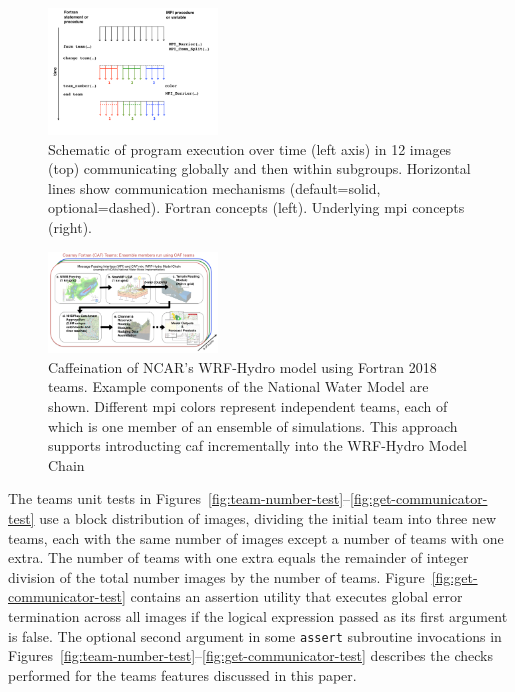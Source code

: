 \begin{figure}
\includegraphics[width=0.4\textwidth]{figures/teams}
\vspace{-24pt}
\caption{Schematic of program execution over time
  (left axis) in 12 images (top) communicating globally and then within subgroups.  Horizontal lines show communication mechanisms (default=solid, optional=dashed).  Fortran concepts (left).  Underlying \gls{mpi} concepts (right).\label{fig:teams}}
\end{figure}
%

\begin{figure}
\includegraphics[width=0.4\textwidth]{figures/WRF-Hydro-caf-ens-model_chain.png}
\vspace{-7pt}
\caption{Caffeination of NCAR's WRF-Hydro model using Fortran 2018
  teams. Example components of  the National Water
  Model are shown. Different \gls{mpi} colors represent independent teams,
  each of which is one member of an ensemble of simulations.
  This approach supports introducting \gls{caf} incrementally
  into the WRF-Hydro Model Chain
  \label{fig:caffeinate-wrf-hydro}}
\end{figure}
%

The teams unit tests in
Figures~\ref{fig:team-number-test}--\ref{fig:get-communicator-test} use a block distribution of images,
dividing the initial team into three new teams, each with the same number of images except a number of teams
with one extra. The number of teams with one extra equals the remainder of integer division of the total
number images by the number of teams. Figure~\ref{fig:get-communicator-test} contains an assertion
utility that executes global error termination across all images if the logical expression passed as its
first argument is false.  The optional second argument in some
\texttt{assert} subroutine invocations in Figures~\ref{fig:team-number-test}--\ref{fig:get-communicator-test}
describes the checks performed for the teams features discussed in this paper.

